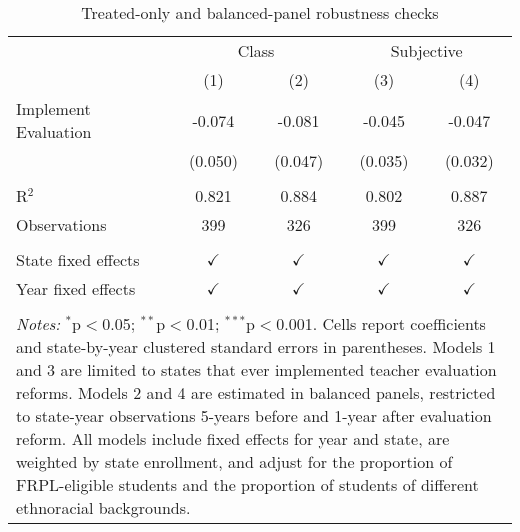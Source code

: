 
\begin{table}[!htbp]
   \centering
   \caption{\label{tab:robust} Treated-only and balanced-panel robustness checks}
   \begin{tabular}{lcccc}
      \toprule
       & \multicolumn{2}{c}{Class} & \multicolumn{2}{c}{Subjective}\\
                           & (1)           & (2)           & (3)           & (4)\\
      \midrule 
      Implement Evaluation & -0.074        & -0.081        & -0.045        & -0.047\\
                           & (0.050)       & (0.047)       & (0.035)       & (0.032)\\
      \hline \\[-1.8ex]
      R$^2$                & 0.821         & 0.884         & 0.802         & 0.887\\
      Observations         & 399           & 326           & 399           & 326\\
       \hline \\[-1.8ex]
      State fixed effects  & $\checkmark$ & $\checkmark$ & $\checkmark$ & $\checkmark$\\
      Year fixed effects   & $\checkmark$ & $\checkmark$ & $\checkmark$ & $\checkmark$\\
      \bottomrule
   \\[-1.8ex]
  
  \multicolumn{5}{l}{
  	\begin{minipage}{10cm} \footnotesize \emph{Notes:} $^{*}$p$<$0.05; $^{**}$p$<$0.01; $^{***}$p$<$0.001. Cells report coefficients and state-by-year clustered standard errors in parentheses. Models 1 and 3 are limited to states that ever implemented teacher evaluation reforms. Models 2 and 4 are estimated in balanced panels, restricted to state-year observations 5-years before and 1-year after evaluation reform. All models include fixed effects for year and state, are weighted by state enrollment, and adjust for the proportion of FRPL-eligible students and the proportion of students of different ethnoracial backgrounds.
	\end{minipage}
} \\
\end{tabular}
\end{table}